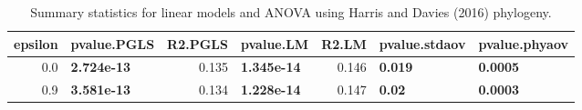 \documentclass[]{article}
\begin{document}
\begin{table}[H]

\caption{\label{tab:unnamed-chunk-43}Summary statistics for linear models and ANOVA using Harris and Davies (2016) phylogeny.}
\centering
\begin{tabular}{r|l|r|l|r|l|l}
\hline
epsilon & pvalue.PGLS & R2.PGLS & pvalue.LM & R2.LM & pvalue.stdaov & pvalue.phyaov\\
\hline
0.0 & \textbf{2.724e-13} & 0.135 & \textbf{1.345e-14} & 0.146 & \textbf{0.019} & \textbf{0.0005}\\
\hline
0.9 & \textbf{3.581e-13} & 0.134 & \textbf{1.228e-14} & 0.147 & \textbf{0.02} & \textbf{0.0003}\\
\hline
\end{tabular}
\end{table}
\end{document}
